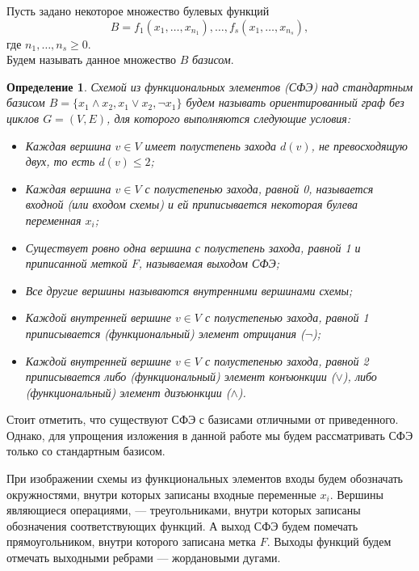 \documentclass[makeidx, a4paper, 14pt]{extarticle}
\newtheorem{definition}{Определение}
\begin{document}
Пусть задано некоторое множество булевых функций \[{B = {f_1(x_1, \dots, x_{n_1}), \dots, f_s(x_1, \dots, x_{n_s})}}, \]
где $n_1, \dots, n_s \ge 0$. \\ Будем называть данное множество $B$ \emph{базисом}.

\begin{definition}
    Схемой из функциональных элементов (СФЭ) над стандартным базисом ${B = \{x_1 \wedge x_2, x_1 \vee x_2, \neg{x_1}\}}$
    будем называть ориентированный граф без циклов ${G=(V, E)}$, для которого выполняются следующие условия:
    \begin{itemize}
        \item Каждая вершина $v \in V$ имеет полустепень захода $d(v)$, не превосходящую двух, то есть ${d(v) \le 2}$;
        \item Каждая вершина $v \in V$ с полустепенью захода, равной 0, называется входной (или входом схемы) и ей приписывается некоторая булева переменная $x_i$;
        \item Существует ровно одна вершина с полустепень захода, равной 1 и приписанной меткой $F$, называемая выходом СФЭ;
        \item Все другие вершины называются внутренними вершинами схемы;
        \item Каждой внутренней вершине $v \in V$ с полустепенью захода, равной 1 приписывается (функциональный) элемент отрицания ($\neg$);
        \item Каждой внутренней вершине $v \in V$ с полустепенью захода, равной 2 приписывается либо (функциональный) элемент конъюнкции ($\vee$),
        либо (функциональный) элемент дизъюнкции ($\wedge$).
    \end{itemize}
\end{definition}

Стоит отметить, что существуют СФЭ с базисами отличными от приведенного. Однако, для упрощения изложения в данной работе мы будем рассматривать СФЭ
только со стандартным базисом.

При изображении схемы из функциональных элементов входы будем обозначать окружностями, внутри которых записаны входные переменные $x_i$.
Вершины являющиеся операциями, --- треугольниками, внутри которых записаны обозначения соответствующих функций.
А выход СФЭ будем помечать прямоугольником, внутри которого записана метка $F$. Выходы функций будем отмечать
выходными ребрами --- жордановыми дугами.
\end{document}
